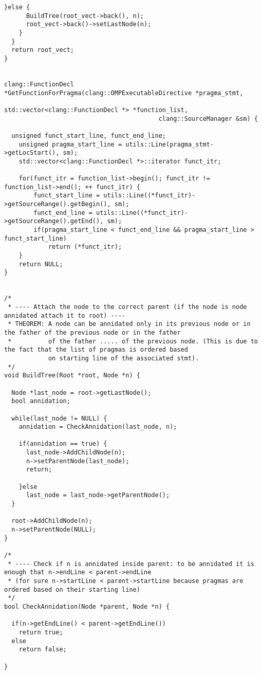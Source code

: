 \documentclass[a4paper,10pt,twoside]{book}
\begin{document}
\begin{lstlisting}[language=CCC, caption=pragma\_handler/create\_tree.cpp]
    }else {
      BuildTree(root_vect->back(), n);
      root_vect->back()->setLastNode(n);
    }
  }
  return root_vect;
}


clang::FunctionDecl *GetFunctionForPragma(clang::OMPExecutableDirective *pragma_stmt, 
										  std::vector<clang::FunctionDecl *> *function_list, 
										  clang::SourceManager &sm) {

  unsigned funct_start_line, funct_end_line;
	unsigned pragma_start_line = utils::Line(pragma_stmt->getLocStart(), sm);
	std::vector<clang::FunctionDecl *>::iterator funct_itr;

	for(funct_itr = function_list->begin(); funct_itr != function_list->end(); ++ funct_itr) {
		funct_start_line = utils::Line((*funct_itr)->getSourceRange().getBegin(), sm);
		funct_end_line = utils::Line((*funct_itr)->getSourceRange().getEnd(), sm);
		if(pragma_start_line < funct_end_line && pragma_start_line > funct_start_line)
			return (*funct_itr);
	}
	return NULL;
}


/*
 * ---- Attach the node to the correct parent (if the node is node annidated attach it to root) ----
 * THEOREM: A node can be annidated only in its previous node or in the father of the previous node or in the father 
 *          of the father ..... of the previous node. (This is due to the fact that the list of pragmas is ordered based
            on starting line of the associated stmt).
 */ 
void BuildTree(Root *root, Node *n) {

  Node *last_node = root->getLastNode();
  bool annidation;

  while(last_node != NULL) {
    annidation = CheckAnnidation(last_node, n);

    if(annidation == true) {
      last_node->AddChildNode(n);
      n->setParentNode(last_node);
      return;

    }else 
      last_node = last_node->getParentNode();
  }

  root->AddChildNode(n);
  n->setParentNode(NULL);
}

/*
 * ---- Check if n is annidated inside parent: to be annidated it is enough that n->endLine < parent->endLine 
 * (for sure n->startLine < parent->startLine because pragmas are ordered based on their starting line)
 */ 
bool CheckAnnidation(Node *parent, Node *n) {

  if(n->getEndLine() < parent->getEndLine())  
    return true;
  else
    return false;
  
}
\end{lstlisting}
\end{document}
